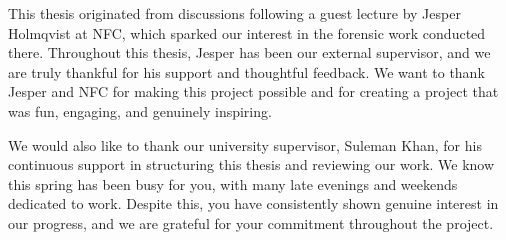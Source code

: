 


This thesis originated from discussions following a guest lecture by Jesper Holmqvist at NFC, which sparked our interest in the forensic work conducted there. Throughout this thesis, Jesper has been our external supervisor, and we are truly thankful for his support and thoughtful feedback. We want to thank Jesper and NFC for making this project possible and for creating a project that was fun, engaging, and genuinely inspiring.

We would also like to thank our university supervisor, Suleman Khan, for his continuous support in structuring this thesis and reviewing our work. We know this spring has been busy for you, with many late evenings and weekends dedicated to work. Despite this, you have consistently shown genuine interest in our progress, and we are grateful for your commitment throughout the project.


